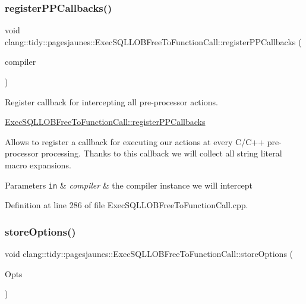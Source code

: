 \subsubsection{\texorpdfstring{register\+P\+P\+Callbacks()}{registerPPCallbacks()}}
{\footnotesize\ttfamily void clang\+::tidy\+::pagesjaunes\+::\+Exec\+S\+Q\+L\+L\+O\+B\+Free\+To\+Function\+Call\+::register\+P\+P\+Callbacks (\begin{DoxyParamCaption}\item[{Compiler\+Instance \&}]{compiler }\end{DoxyParamCaption})\hspace{0.3cm}{\ttfamily [override]}}



Register callback for intercepting all pre-\/processor actions. 

\hyperlink{classclang_1_1tidy_1_1pagesjaunes_1_1_exec_s_q_l_l_o_b_free_to_function_call_adfca3356f7ce579a0fb9c52edaba2fb8}{Exec\+S\+Q\+L\+L\+O\+B\+Free\+To\+Function\+Call\+::register\+P\+P\+Callbacks}

Allows to register a callback for executing our actions at every C/\+C++ pre-\/processor processing. Thanks to this callback we will collect all string literal macro expansions.


\begin{DoxyParams}[1]{Parameters}
\mbox{\tt in}  & {\em compiler} & the compiler instance we will intercept \\
\hline
\end{DoxyParams}


Definition at line 286 of file Exec\+S\+Q\+L\+L\+O\+B\+Free\+To\+Function\+Call.\+cpp.

\mbox{\label{classclang_1_1tidy_1_1pagesjaunes_1_1_exec_s_q_l_l_o_b_free_to_function_call_a6b661c169889e1165f82b4049b440439}} 
\subsubsection{\texorpdfstring{store\+Options()}{storeOptions()}}
{\footnotesize\ttfamily void clang\+::tidy\+::pagesjaunes\+::\+Exec\+S\+Q\+L\+L\+O\+B\+Free\+To\+Function\+Call\+::store\+Options (\begin{DoxyParamCaption}\item[{Clang\+Tidy\+Options\+::\+Option\+Map \&}]{Opts }\end{DoxyParamCaption})\hspace{0.3cm}{\ttfamily [override]}}



